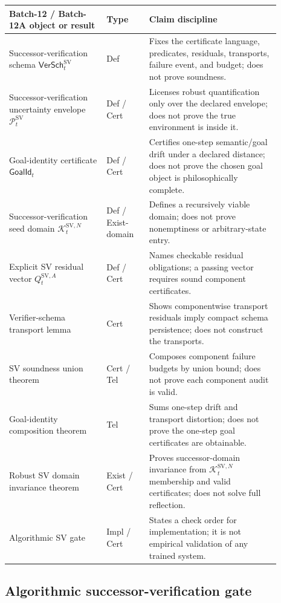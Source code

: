 \documentclass[11pt]{article}
\newcommand{\Pcal}{\mathcal{P}}
\newcommand{\1}{\mathbf{1}}
\providecommand{\Kcal}{\mathcal{K}}
\begin{document}
\begin{center}
\begin{tabular}{@{}p{0.32\linewidth}p{0.14\linewidth}p{0.43\linewidth}@{}}
\toprule
\textbf{Batch-12 / Batch-12A object or result} & \textbf{Type} & \textbf{Claim discipline}\\
\midrule
Successor-verification schema \(\mathsf{VerSch}_t^{\mathrm{SV}}\) & Def & Fixes the certificate language, predicates, residuals, transports, failure event, and budget; does not prove soundness.\\
Successor-verification uncertainty envelope \(\Pcal_t^{\mathrm{SV}}\) & Def / Cert & Licenses robust quantification only over the declared envelope; does not prove the true environment is inside it.\\
Goal-identity certificate \(\mathsf{GoalId}_t\) & Def / Cert & Certifies one-step semantic/goal drift under a declared distance; does not prove the chosen goal object is philosophically complete.\\
Successor-verification seed domain \(\Kcal_t^{\mathrm{SV},N}\) & Def / Exist-domain & Defines a recursively viable domain; does not prove nonemptiness or arbitrary-state entry.\\
Explicit SV residual vector \(Q_t^{\mathrm{SV},A}\) & Def / Cert & Names checkable residual obligations; a passing vector requires sound component certificates.\\
Verifier-schema transport lemma & Cert & Shows componentwise transport residuals imply compact schema persistence; does not construct the transports.\\
SV soundness union theorem & Cert / Tel & Composes component failure budgets by union bound; does not prove each component audit is valid.\\
Goal-identity composition theorem & Tel & Sums one-step drift and transport distortion; does not prove the one-step goal certificates are obtainable.\\
Robust SV domain invariance theorem & Exist / Cert & Proves successor-domain invariance from \(\Kcal_t^{\mathrm{SV},N}\) membership and valid certificates; does not solve full reflection.\\
Algorithmic SV gate & Impl / Cert & States a check order for implementation; it is not empirical validation of any trained system.\\
\bottomrule
\end{tabular}
\end{center}

\subsection{Algorithmic successor-verification gate}
\end{document}
